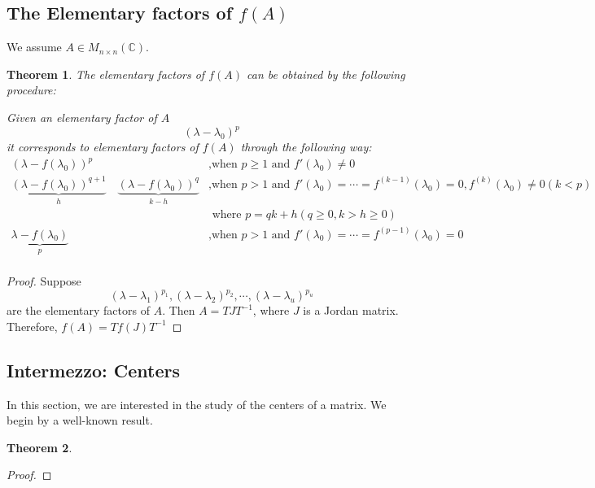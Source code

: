 \documentclass{book}
\newtheorem{theorem}{Theorem}[section]
\theoremstyle{definition}
\begin{document}
\subsection{The Elementary factors of $f(A)$}
We assume $A\in M_{n\times n}(\mathbb{C})$.
\begin{theorem}
The elementary factors of $f(A)$ can be obtained by the following procedure:\par
Given an elementary factor of $A$ \[(\lambda-\lambda_0)^p\]
it corresponds to elementary factors of $f(A)$ through the following way:
\begin{align*}
    (\lambda-f(\lambda_0))^p &\text{,when } p\ge 1\text{ and }f'(\lambda_0)\ne 0\\
    \underbrace{(\lambda-f(\lambda_0))^{q+1}}_h \quad \underbrace{(\lambda-f(\lambda_0))^q}_{k-h}&\text{,when } p>1\text{ and }f'(\lambda_0)=\cdots=f^{(k-1)}(\lambda_0)=0,f^{(k)}(\lambda_0)\ne 0(k<p)\\
    &\text{ where }p=qk+h(q\ge0,k>h\ge0)\\
    \underbrace{\lambda-f(\lambda_0)} _{ p} &\text{,when }p>1\text{ and }f'(\lambda_0)=\cdots=f^{(p-1)}(\lambda_0)=0\\
\end{align*}
\end{theorem}
\begin{proof}
 Suppose 
\[(\lambda-\lambda_1)^{p_1},(\lambda-\lambda_2)^{p_2},\cdots,(\lambda-\lambda_u)^{p_u}\]
are the elementary factors of $A$. Then $A=TJT^{-1}$, where $J$ is a Jordan matrix. Therefore, $f(A)=Tf(J)T^{-1}$
\end{proof}



\subsection{Intermezzo: Centers}
In this section, we are interested in the study of the centers of a matrix. We begin by a well-known result.
\begin{theorem}

\end{theorem}
\begin{proof}

\end{proof}
\end{document}
